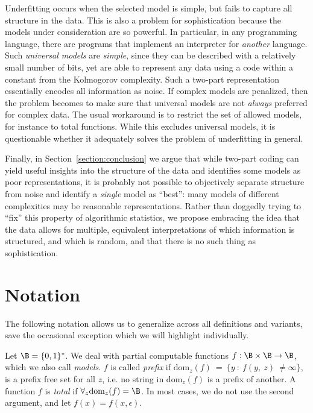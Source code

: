 Underfitting occurs when the selected model is simple, but fails to capture all structure in the data. This is also a problem for sophistication because the models under consideration are so powerful. In particular, in any programming language, there are programs that implement an interpreter for \emph{another} language. Such \emph{universal models} are \emph{simple}, since they can be described with a relatively small number of bits, yet are able to represent any data using a code within a constant from the Kolmogorov complexity. Such a two-part representation essentially encodes all information as noise. If complex models are penalized, then the problem becomes to make sure that universal models are not \emph{always} preferred for complex data. The usual workaround is to restrict the set of allowed models, for instance to total functions. While this excludes universal models, it is questionable whether it adequately solves the problem of underfitting in general.

Finally, in Section~\ref{section:conclusion} we argue that while two-part coding can yield useful insights into the structure of the data and identifies some models as poor representations, it is probably not possible to objectively separate structure from noise and identify a \emph{single} model as ``best'': many models of different complexities may be reasonable representations. Rather than doggedly trying to ``fix'' this property of algorithmic statistics, we propose embracing the idea that the data allows for multiple, equivalent interpretations of which information is structured, and which is random, and that there is no such thing as sophistication.

\section{Notation}\enlargethispage{3\baselineskip}
The following notation allows us to generalize across all definitions and variants, save the occasional exception which we will highlight individually.

Let $\B = \{0,1\}^*$. We deal with partial computable functions $f: \B \times \B \to \B$, which we
also call \emph{models}. $f$ is called \emph{prefix} if $\text{dom}_z(f)~=~\{y~:~f(y,~z)~\neq \infty\}$, is a prefix free set for all $z$, i.e. no string in $\text{dom}_z(f)$ is a prefix of another. A function $f$ is \emph{total} if $\forall_z \text{dom}_z(f) = \B$. In most cases, we do not use the second argument, and let $f(x) = f(x, \epsilon)$.

